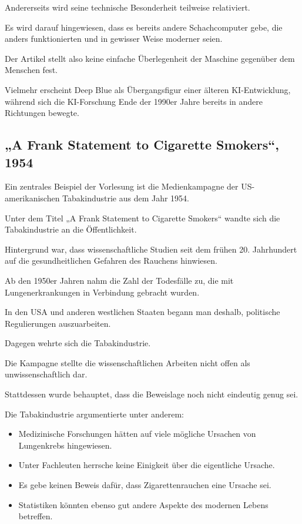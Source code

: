 Andererseits wird seine technische Besonderheit
teilweise relativiert.

Es wird darauf hingewiesen,
dass es bereits andere Schachcomputer gebe,
die anders funktionierten
und in gewisser Weise moderner seien.

Der Artikel stellt also keine einfache Überlegenheit
der Maschine gegenüber dem Menschen fest.

Vielmehr erscheint Deep Blue
als Übergangsfigur einer älteren KI-Entwicklung,
während sich die KI-Forschung Ende der 1990er Jahre
bereits in andere Richtungen bewegte.

\subsection{„A Frank Statement to Cigarette Smokers“, 1954}

Ein zentrales Beispiel der Vorlesung
ist die Medienkampagne der US-amerikanischen Tabakindustrie
aus dem Jahr 1954.

Unter dem Titel
„A Frank Statement to Cigarette Smokers“
wandte sich die Tabakindustrie
an die Öffentlichkeit.

Hintergrund war,
dass wissenschaftliche Studien
seit dem frühen 20. Jahrhundert
auf die gesundheitlichen Gefahren des Rauchens hinwiesen.

Ab den 1950er Jahren nahm die Zahl der Todesfälle zu,
die mit Lungenerkrankungen in Verbindung gebracht wurden.

In den USA und anderen westlichen Staaten
begann man deshalb,
politische Regulierungen auszuarbeiten.

Dagegen wehrte sich die Tabakindustrie.

Die Kampagne stellte die wissenschaftlichen Arbeiten
nicht offen als unwissenschaftlich dar.

Stattdessen wurde behauptet,
dass die Beweislage noch nicht eindeutig genug sei.

Die Tabakindustrie argumentierte unter anderem:

\begin{itemize}
\item Medizinische Forschungen hätten auf viele mögliche Ursachen von Lungenkrebs hingewiesen.
\item Unter Fachleuten herrsche keine Einigkeit über die eigentliche Ursache.
\item Es gebe keinen Beweis dafür, dass Zigarettenrauchen eine Ursache sei.
\item Statistiken könnten ebenso gut andere Aspekte des modernen Lebens betreffen.
\end{itemize}

